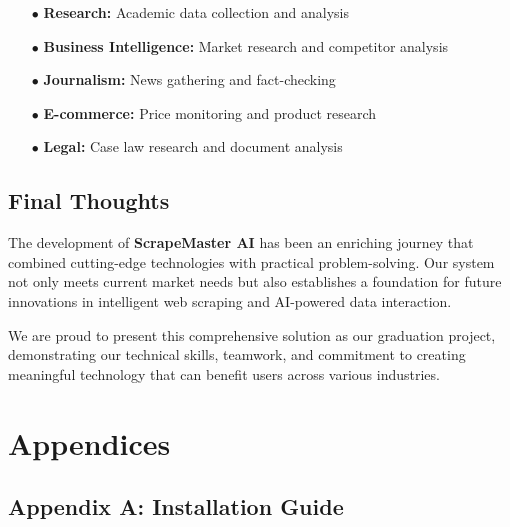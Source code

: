 \documentclass[12pt,a4paper]{report}
\begin{document}
\begin{itemize}[leftmargin=2cm]
    \item[\textcolor{accentorange}{$\bullet$}] \textbf{Research:} Academic data collection and analysis
    \item[\textcolor{accentorange}{$\bullet$}] \textbf{Business Intelligence:} Market research and competitor analysis
    \item[\textcolor{accentorange}{$\bullet$}] \textbf{Journalism:} News gathering and fact-checking
    \item[\textcolor{accentorange}{$\bullet$}] \textbf{E-commerce:} Price monitoring and product research
    \item[\textcolor{accentorange}{$\bullet$}] \textbf{Legal:} Case law research and document analysis
\end{itemize}

\section{Final Thoughts}

The development of \textbf{ScrapeMaster AI} has been an enriching journey that combined cutting-edge technologies with practical problem-solving. Our system not only meets current market needs but also establishes a foundation for future innovations in intelligent web scraping and AI-powered data interaction.

We are proud to present this comprehensive solution as our graduation project, demonstrating our technical skills, teamwork, and commitment to creating meaningful technology that can benefit users across various industries.

\vspace{2cm}

\begin{center}
\end{center}

\chapter*{Appendices}

\section*{Appendix A: Installation Guide}
\end{document}
